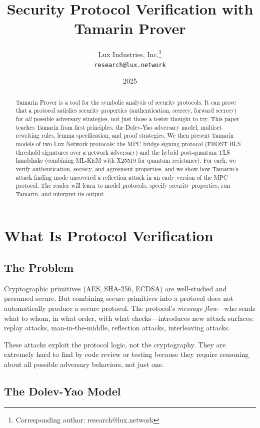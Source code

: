 \documentclass[11pt,a4paper]{article}
\title{Security Protocol Verification with Tamarin Prover}
\author{
Lux Industries, Inc.\thanks{Corresponding author: research@lux.network}\\
\texttt{research@lux.network}
}
\date{2025}
\begin{document}
\luxcoverpage

\begin{abstract}
Tamarin Prover is a tool for the symbolic analysis of security protocols. It can prove
that a protocol satisfies security properties (authentication, secrecy, forward secrecy)
for \emph{all} possible adversary strategies, not just those a tester thought to try.
This paper teaches Tamarin from first principles: the Dolev-Yao adversary model,
multiset rewriting rules, lemma specification, and proof strategies. We then present
Tamarin models of two Lux Network protocols: the MPC bridge signing protocol (FROST-BLS
threshold signatures over a network adversary) and the hybrid post-quantum TLS handshake
(combining ML-KEM with X25519 for quantum resistance). For each, we verify authentication,
secrecy, and agreement properties, and we show how Tamarin's attack finding mode uncovered
a reflection attack in an early version of the MPC protocol. The reader will learn to
model protocols, specify security properties, run Tamarin, and interpret its output.
\end{abstract}

\tableofcontents
\newpage

\section{What Is Protocol Verification}

\subsection{The Problem}

Cryptographic primitives (AES, SHA-256, ECDSA) are well-studied and presumed secure.
But combining secure primitives into a protocol does not automatically produce a secure
protocol. The protocol's \emph{message flow}---who sends what to whom, in what order,
with what checks---introduces new attack surfaces: replay attacks, man-in-the-middle,
reflection attacks, interleaving attacks.

These attacks exploit the protocol logic, not the cryptography. They are extremely hard
to find by code review or testing because they require reasoning about all possible
adversary behaviors, not just one.

\subsection{The Dolev-Yao Model}
\end{document}
